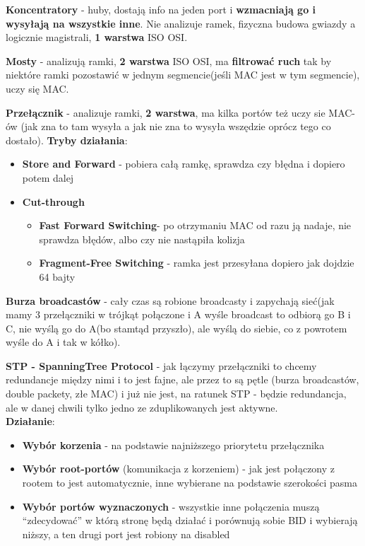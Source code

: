 \documentclass[../main.tex]{subfiles}
\begin{document}
    \textbf{Koncentratory} - huby, dostają info na jeden port i \textbf{wzmacniają go i wysyłają na
    wszystkie inne}. Nie analizuje ramek, fizyczna budowa gwiazdy a logicznie magistrali,
    \textbf{1 warstwa} ISO OSI.

    \textbf{Mosty} - analizują ramki, \textbf{2 warstwa} ISO OSI, ma \textbf{filtrować ruch} tak by niektóre
    ramki pozostawić w jednym segmencie(jeśli MAC jest w tym segmencie), uczy się MAC.

    \textbf{Przełącznik} - analizuje ramki, \textbf{2 warstwa}, ma kilka portów też uczy sie
    MAC-ów (jak zna to tam wysyła a jak nie zna to wysyła wszędzie oprócz tego co dostało).
    \textbf{Tryby działania}:
    \begin{itemize}
        \item \textbf{Store and Forward} - pobiera całą ramkę, sprawdza czy błędna i dopiero potem dalej
        \item \textbf{Cut-through}
        \begin{itemize}
            \item \textbf{Fast Forward Switching}- po otrzymaniu MAC od razu ją nadaje, nie sprawdza błędów, albo czy nie nastąpiła kolizja
            \item \textbf{Fragment-Free Switching} - ramka jest przesyłana dopiero jak dojdzie 64 bajty
        \end{itemize}
    \end{itemize}

    \textbf{Burza broadcastów} - cały czas są robione broadcasty i zapychają sieć(jak mamy
    3 przełączniki w trójkąt połączone i A wyśle broadcast to odbiorą go B i C, nie wyślą go do
    A(bo stamtąd przyszło), ale wyślą do siebie, co z powrotem wyśle do A i tak w kółko).

    \textbf{STP - SpanningTree Protocol} - jak łączymy przełączniki to chcemy
    redundancje między nimi i to jest fajne, ale przez to są pętle (burza broadcastów,
    double packety, złe MAC) i już nie jest, na ratunek STP - będzie redundancja, ale w
    danej chwili tylko jedno ze zduplikowanych jest aktywne.\\
    \textbf{Działanie}:
    \begin{itemize}
        \item \textbf{Wybór korzenia} - na podstawie najniższego priorytetu przełącznika
        \item \textbf{Wybór root-portów} (komunikacja z korzeniem) - jak jest połączony z rootem to jest automatycznie, inne wybierane na podstawie szerokości pasma
        \item \textbf{Wybór portów wyznaczonych} - wszystkie inne połączenia muszą “zdecydować” w którą stronę będą działać i porównują sobie BID i wybierają niższy, a ten drugi port jest robiony na disabled
    \end{itemize}
\end{document}
